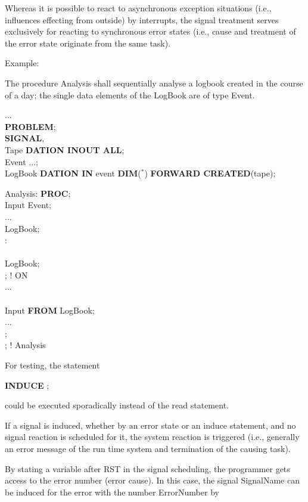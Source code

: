 Whereas it is possible to react to asynchronous exception situations
(i.e., influences effecting from outside) by interrupts, the signal
treatment serves exclusively for reacting to synchronous error states
(i.e., cause and treatment of the error state originate from the same
task).

Example:

The procedure Analysis shall sequentially analyse a logbook created
in the course of a day; the single data elements of the LogBook are of
type Event.

...\\
{\bf PROBLEM};\\
   {\bf SIGNAL},\\
\x \x Tape {\bf DATION INOUT  ALL};\\
 Event ...;\\
 LogBook {\bf DATION IN} event {\bf DIM}($^*$) {\bf FORWARD CREATED}(tape);

Analysis: {\bf PROC};\\
 Input Event;\\
\x ...\\
 LogBook;\\
 :\\
\x {}\\
\x \x {} LogBook;\\
\x {}; ! ON \\
\x ...\\
\\
\x {} Input {\bf FROM} LogBook;\\
\x \x ...\\
;\\
; ! Analysis

For testing, the statement

{\bf INDUCE} ;

could be executed sporadically instead of the read statement.

If a signal is induced, whether by an error state or an induce
statement, and no signal reaction is scheduled for it, the system
reaction is triggered (i.e., generally an error message of the run time
system and termination of the causing task).

By stating a variable after RST in the signal scheduling, the programmer
gets access to the error number (error cause). In this case, the signal
SignalName can be induced for the error with the number ErrorNumber by

